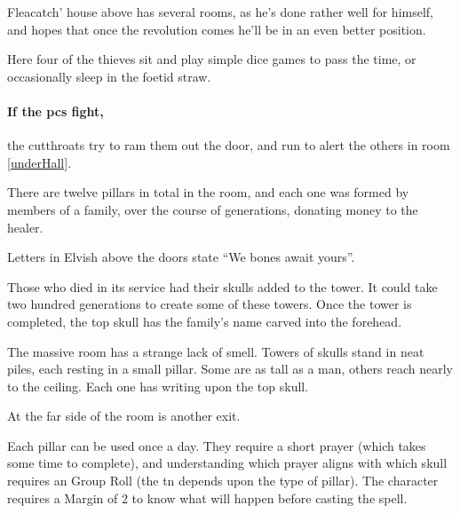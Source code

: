 Fleacatch' house above has several rooms, as he's done rather well for himself, and hopes that once the revolution comes he'll be in an even better position.



Here four of the thieves sit and play simple dice games to pass the time, or occasionally sleep in the foetid straw.

\paragraph{If the \glspl{pc} fight,}
the cutthroats try to ram them out the door, and run to alert the others in room \ref{underHall}.



There are twelve pillars in total in the room, and each one was formed by members of a family, over the course of generations, donating money to the \gls{healer}.

\begin{boxtext}
  Letters in Elvish above the doors state ``We bones await yours''.
\end{boxtext}

Those who died in its service had their skulls added to the tower.
It could take two hundred generations to create some of these towers.
Once the tower is completed, the top skull has the family's name carved into the forehead.

\begin{boxtext}

  The massive room has a strange lack of smell.  Towers of skulls stand in neat piles, each resting in a small pillar.  Some are as tall as a man, others reach nearly to the ceiling.  Each one has writing upon the top skull.

  At the far side of the room is another exit.

\end{boxtext}

Each pillar can be used once a day.
They require a short prayer (which takes some time to complete), and understanding which prayer aligns with which skull requires an  Group Roll (the \gls{tn} depends upon the type of pillar).
The character requires a Margin of 2 to know what will happen before casting the spell.%

